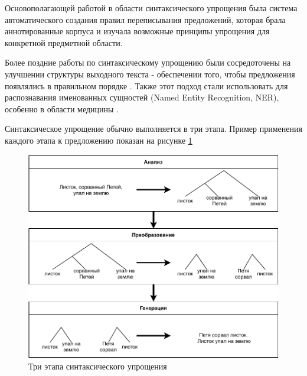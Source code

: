 
Основополагающей работой в области синтаксического упрощения была система автоматического создания правил переписывания предложений\cite{chandrasekar_automatic_1997}, которая брала аннотированные корпуса и изучала возможные принципы упрощения для конкретной предметной области.  

Более поздние работы по синтаксическому упрощению были сосредоточены на улучшении структуры выходного текста - обеспечении того, чтобы предложения появлялись в правильном порядке \cite{siddharthan_syntactic_2006}. Также этот подход стали использовать для распознавания именованных сущностей (Named Entity Recognition, NER), особенно в области медицины \cite{jonnalagadda_biosimplify_2010}.

Синтаксическое упрощение обычно выполняется в три этапа. Пример применения каждого этапа к предложению показан на рисунке \ref{fig:3steps}

\clearpage
\begin{figure}[h!]
	\begin{center}
		\includegraphics[pages=-, scale=0.9]{./inc/img/3steps_my.pdf}
		\caption{Три этапа синтаксического упрощения}  
		\label{fig:3steps}
	\end{center}
\end{figure}



